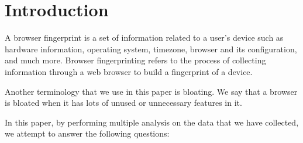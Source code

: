 \section{Introduction}
\label{sec:introduction}

A browser fingerprint is a set of information related to a user’s device such as hardware information, operating system, timezone, browser and its configuration, and much more. Browser fingerprinting refers to the
process of collecting information through a web browser to build a fingerprint of a device.

Another terminology that we use in this paper is bloating. We say that a browser is bloated when it has lots of unused or unnecessary features in it.

In this paper, by performing multiple analysis on the data that we have collected, we attempt to answer
the following questions:

